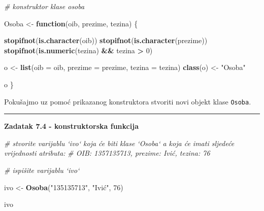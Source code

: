 \documentclass[]{book}
\newenvironment{Shaded}{\begin{snugshade}}{\end{snugshade}}
\newcommand{\KeywordTok}[1]{\textcolor[rgb]{0.13,0.29,0.53}{\textbf{#1}}}
\newcommand{\DataTypeTok}[1]{\textcolor[rgb]{0.13,0.29,0.53}{#1}}
\newcommand{\DecValTok}[1]{\textcolor[rgb]{0.00,0.00,0.81}{#1}}
\newcommand{\StringTok}[1]{\textcolor[rgb]{0.31,0.60,0.02}{#1}}
\newcommand{\CommentTok}[1]{\textcolor[rgb]{0.56,0.35,0.01}{\textit{#1}}}
\newcommand{\ControlFlowTok}[1]{\textcolor[rgb]{0.13,0.29,0.53}{\textbf{#1}}}
\newcommand{\OperatorTok}[1]{\textcolor[rgb]{0.81,0.36,0.00}{\textbf{#1}}}
\newcommand{\NormalTok}[1]{#1}
\theoremstyle{definition}
\theoremstyle{definition}
\theoremstyle{definition}
\theoremstyle{remark}
\begin{document}
\begin{Shaded}
\begin{Highlighting}[]
\CommentTok{# konstruktor klase osoba}

\NormalTok{Osoba <-}\StringTok{ }\ControlFlowTok{function}\NormalTok{(oib, prezime, tezina) \{}

    \KeywordTok{stopifnot}\NormalTok{(}\KeywordTok{is.character}\NormalTok{(oib))}
    \KeywordTok{stopifnot}\NormalTok{(}\KeywordTok{is.character}\NormalTok{(prezime))}
    \KeywordTok{stopifnot}\NormalTok{(}\KeywordTok{is.numeric}\NormalTok{(tezina) }\OperatorTok{&&}\StringTok{ }\NormalTok{tezina }\OperatorTok{>}\StringTok{ }\DecValTok{0}\NormalTok{)}

\NormalTok{    o <-}\StringTok{ }\KeywordTok{list}\NormalTok{(}\DataTypeTok{oib =}\NormalTok{ oib, }\DataTypeTok{prezime =}\NormalTok{ prezime, }\DataTypeTok{tezina =}\NormalTok{ tezina)}
    \KeywordTok{class}\NormalTok{(o) <-}\StringTok{ "Osoba"}

\NormalTok{    o}
\NormalTok{\}}
\end{Highlighting}
\end{Shaded}

Pokušajmo uz pomoć prikazanog konstruktora stvoriti novi objekt klase
\texttt{Osoba}.

\begin{center}\rule{0.5\linewidth}{\linethickness}\end{center}

\textbf{Zadatak 7.4 - konstruktorska funkcija}

\begin{Shaded}
\begin{Highlighting}[]
\CommentTok{# stvorite varijablu `ivo` koja će biti klase `Osoba` a koja će imati sljedeće vrijednosti atributa:}
\CommentTok{# OIB: 1357135713, prezime: Ivić, tezina: 76}

\CommentTok{# ispišite varijablu `ivo`}
\end{Highlighting}
\end{Shaded}

\begin{Shaded}
\begin{Highlighting}[]
\NormalTok{ivo <-}\StringTok{ }\KeywordTok{Osoba}\NormalTok{(}\StringTok{"135135713"}\NormalTok{, }\StringTok{"Ivić"}\NormalTok{, }\DecValTok{76}\NormalTok{)}

\NormalTok{ivo}
\end{Highlighting}
\end{Shaded}
\end{document}
